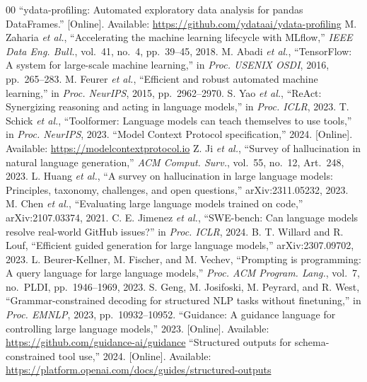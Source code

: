 \documentclass[conference]{IEEEtran}
\begin{document}
\begin{thebibliography}{00}
 ``ydata-profiling: Automated exploratory data analysis for pandas DataFrames.'' [Online]. Available: \url{https://github.com/ydataai/ydata-profiling}
 M. Zaharia \emph{et al.}, ``Accelerating the machine learning lifecycle with MLflow,'' \emph{IEEE Data Eng. Bull.}, vol.~41, no.~4, pp.~39--45, 2018.
 M. Abadi \emph{et al.}, ``TensorFlow: A system for large-scale machine learning,'' in \emph{Proc. USENIX OSDI}, 2016, pp.~265--283.
 M. Feurer \emph{et al.}, ``Efficient and robust automated machine learning,'' in \emph{Proc. NeurIPS}, 2015, pp.~2962--2970.
 S. Yao \emph{et al.}, ``ReAct: Synergizing reasoning and acting in language models,'' in \emph{Proc. ICLR}, 2023.
 T. Schick \emph{et al.}, ``Toolformer: Language models can teach themselves to use tools,'' in \emph{Proc. NeurIPS}, 2023.
 ``Model Context Protocol specification,'' 2024. [Online]. Available: \url{https://modelcontextprotocol.io}
 Z. Ji \emph{et al.}, ``Survey of hallucination in natural language generation,'' \emph{ACM Comput. Surv.}, vol.~55, no.~12, Art.~248, 2023.
 L. Huang \emph{et al.}, ``A survey on hallucination in large language models: Principles, taxonomy, challenges, and open questions,'' arXiv:2311.05232, 2023.
 M. Chen \emph{et al.}, ``Evaluating large language models trained on code,'' arXiv:2107.03374, 2021.
 C. E. Jimenez \emph{et al.}, ``SWE-bench: Can language models resolve real-world GitHub issues?'' in \emph{Proc. ICLR}, 2024.
 B. T. Willard and R. Louf, ``Efficient guided generation for large language models,'' arXiv:2307.09702, 2023.
 L. Beurer-Kellner, M. Fischer, and M. Vechev, ``Prompting is programming: A query language for large language models,'' \emph{Proc. ACM Program. Lang.}, vol.~7, no.~PLDI, pp.~1946--1969, 2023.
 S. Geng, M. Josifoski, M. Peyrard, and R. West, ``Grammar-constrained decoding for structured NLP tasks without finetuning,'' in \emph{Proc. EMNLP}, 2023, pp.~10932--10952.
 ``Guidance: A guidance language for controlling large language models,'' 2023. [Online]. Available: \url{https://github.com/guidance-ai/guidance}
 ``Structured outputs for schema-constrained tool use,'' 2024. [Online]. Available: \url{https://platform.openai.com/docs/guides/structured-outputs}

\end{thebibliography}
\end{document}
